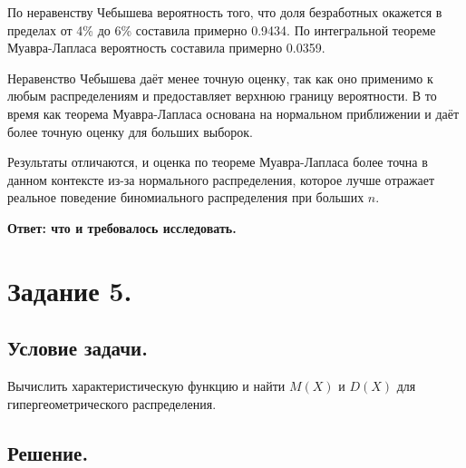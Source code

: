 \documentclass[a4paper, 12pt]{article}
\begin{document}
    По неравенству Чебышева вероятность того, что доля безработных окажется в пределах от 4\% до 6\% составила примерно 
    0.9434. По интегральной теореме Муавра-Лапласа вероятность составила примерно 0.0359.


    Неравенство Чебышева даёт менее точную оценку, так как оно применимо к любым распределениям и предоставляет верхнюю границу вероятности.
    В то время как теорема Муавра-Лапласа основана на нормальном приближении и даёт более точную оценку для больших выборок.

    Результаты отличаются, и оценка по теореме Муавра-Лапласа более точна в данном контексте из-за нормального распределения,
    которое лучше отражает реальное поведение биномиального распределения при больших $n$.


    \textbf{Ответ: что и требовалось исследовать.}


    \section{Задание 5.}
    \subsection{Условие задачи.}
    Вычислить характеристическую функцию и найти $M(X)$ и $D(X)$ для
    гипергеометрического распределения.


    \subsection{Решение.}
\end{document}
